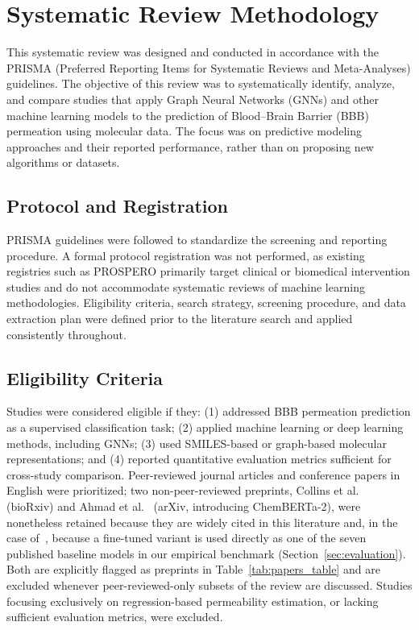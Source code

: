 \documentclass[conference]{IEEEtran}
\begin{document}
\section{Systematic Review Methodology}
This systematic review was designed and conducted in accordance with
the PRISMA (Preferred Reporting Items for Systematic Reviews and
Meta-Analyses) guidelines. The objective of this review was to
systematically identify, analyze, and compare studies that apply Graph
Neural Networks (GNNs) and other machine learning models to the
prediction of Blood–Brain Barrier (BBB) permeation using molecular
data. The focus was on predictive modeling approaches and their
reported performance, rather than on proposing new algorithms or
datasets.

\subsection{Protocol and Registration}

PRISMA guidelines were followed to standardize the screening and reporting procedure. A formal protocol registration was not performed, as existing registries such as PROSPERO primarily target clinical or biomedical intervention studies and do not accommodate systematic reviews of machine learning methodologies. Eligibility criteria, search strategy, screening procedure, and data extraction plan were defined prior to the literature search and applied consistently throughout.

\subsection{Eligibility Criteria}
\label{sec:eligibility}

Studies were considered eligible if they: (1) addressed BBB permeation
prediction as a supervised classification task; (2) applied machine
learning or deep learning methods, including GNNs; (3) used
SMILES-based or graph-based molecular representations; and (4) reported
quantitative evaluation metrics sufficient for cross-study comparison.
Peer-reviewed journal articles and conference papers in English were
prioritized; two non-peer-reviewed preprints,
Collins et al.~\cite{Collins2024} (bioRxiv) and
Ahmad et al.~\cite{Ahmad2022chemberta2} (arXiv, introducing
ChemBERTa-2), were nonetheless retained because they are widely cited
in this literature and, in the case of~\cite{Ahmad2022chemberta2},
because a fine-tuned variant is used directly as one of the seven
published baseline models in our empirical benchmark
(Section~\ref{sec:evaluation}). Both are explicitly flagged as
preprints in Table~\ref{tab:papers_table} and are excluded whenever
peer-reviewed-only subsets of the review are discussed. Studies
focusing exclusively on regression-based permeability estimation, or
lacking sufficient evaluation metrics, were excluded.
\end{document}
